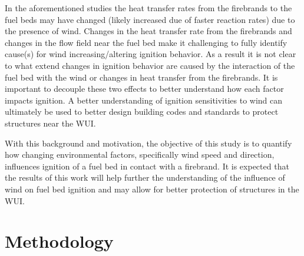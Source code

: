     In the aforementioned studies the heat transfer rates from the firebrands to the fuel beds may have changed (likely increased due of faster reaction rates) due to the presence of wind. Changes in the heat transfer rate from the firebrands and changes in the flow field near the fuel bed make it challenging to fully identify cause(s) for wind increasing/altering ignition behavior.
    As a result it is not clear to what extend changes in ignition behavior are caused by the interaction of the fuel bed with the wind or changes in heat transfer from the firebrands.
    It is important to decouple these two effects to better understand how each factor impacts ignition. A better understanding of ignition sensitivities to wind can ultimately be used to better design building codes and standards to protect structures near the WUI.

    
    
    
    
    With this background and motivation, the objective of this study is to quantify how changing environmental factors, specifically wind speed and direction, influences ignition of a fuel bed in contact with a firebrand. It is expected that the results of this work will help further the understanding of the influence of wind on fuel bed ignition and may allow for better protection of structures in the WUI.

\section{Methodology}

